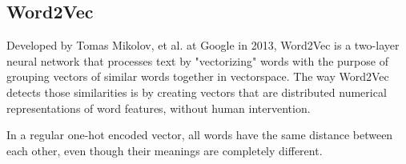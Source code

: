    
        \subsection{Word2Vec}

        \par Developed by Tomas Mikolov, et al.\cite{Mikolov2013} at Google in 2013, Word2Vec is a two-layer neural network that processes text by "vectorizing" words with the purpose of grouping vectors of similar words together in vectorspace. The way Word2Vec detects those similarities is by creating vectors that are distributed numerical representations of word features, without human intervention.


        \par In a regular one-hot encoded vector, all words have the same distance between each other, even though their meanings are completely different.



